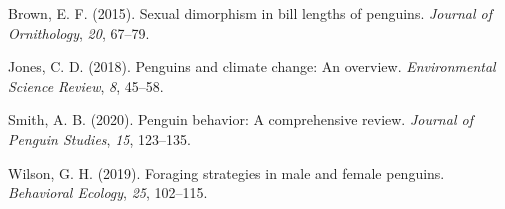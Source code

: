 \documentclass[
  man,
  longtable,
  nolmodern,
  notxfonts,
  notimes,
  colorlinks=true,linkcolor=blue,citecolor=blue,urlcolor=blue]{apa7}
\newlength{\cslhangindent}
\newenvironment{CSLReferences}[2] %
 {\begin{list}{}{%
  \setlength{\itemindent}{0pt}
  \setlength{\leftmargin}{0pt}
  \setlength{\parsep}{0pt}
  \ifodd #1
   \setlength{\leftmargin}{\cslhangindent}
   \setlength{\itemindent}{-1\cslhangindent}
  \fi
  \setlength{\itemsep}{#2\baselineskip}}}
 {\end{list}}
\begin{document}
\label{refs}
\begin{CSLReferences}{1}{0}
Brown, E. F. (2015). Sexual dimorphism in bill lengths of penguins.
\emph{Journal of Ornithology}, \emph{20}, 67--79.

Jones, C. D. (2018). Penguins and climate change: An overview.
\emph{Environmental Science Review}, \emph{8}, 45--58.

Smith, A. B. (2020). Penguin behavior: A comprehensive review.
\emph{Journal of Penguin Studies}, \emph{15}, 123--135.

Wilson, G. H. (2019). Foraging strategies in male and female penguins.
\emph{Behavioral Ecology}, \emph{25}, 102--115.

\end{CSLReferences}
\end{document}
